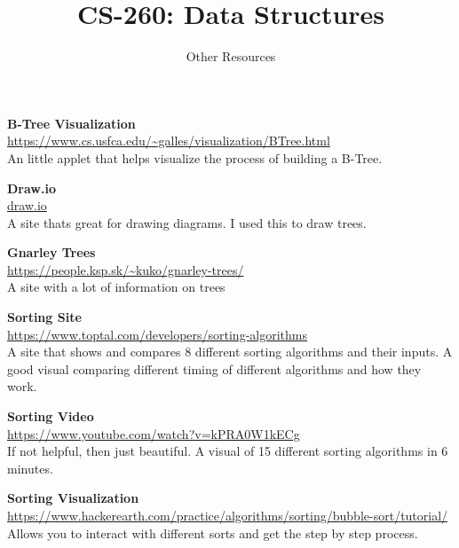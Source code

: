 \documentclass[10pt,letterpaper,oneside]{article}
\title{CS-260: Data Structures}
\author{Other Resources}
\date{}
\begin{document}
\maketitle

\textbf{B-Tree Visualization} \\
\url{https://www.cs.usfca.edu/~galles/visualization/BTree.html} \\
An little applet that helps visualize the process of building a B-Tree.
\vspace{5mm}

\textbf{Draw.io} \\
\url{draw.io} \\
A site thats great for drawing diagrams.
I used this to draw trees.
\vspace{5mm}

\textbf{Gnarley Trees} \\
\url{https://people.ksp.sk/~kuko/gnarley-trees/} \\
A site with a lot of information on trees
\vspace{5mm}

\textbf{Sorting Site} \\
\url{https://www.toptal.com/developers/sorting-algorithms} \\
A site that shows and compares 8 different sorting algorithms and their inputs.
A good visual comparing different timing of different algorithms and how they
work.
\vspace{5mm}

\textbf{Sorting Video} \\
\url{https://www.youtube.com/watch?v=kPRA0W1kECg} \\
If not helpful, then just beautiful.
A visual of 15 different sorting algorithms in 6 minutes.
\vspace{5mm}

\textbf{Sorting Visualization} \\
\url{https://www.hackerearth.com/practice/algorithms/sorting/bubble-sort/tutorial/} \\
Allows you to interact with different sorts and get the step by step process.
\vspace{5mm}
\end{document}
